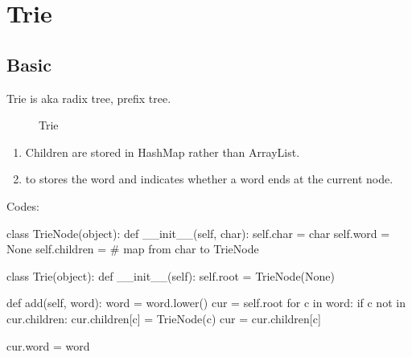 \section{Trie}
\subsection{Basic}
Trie is aka radix tree, prefix tree. 
\begin{figure}[hbtp]
\centering
{}
\caption{Trie}
\label{fig:trie} 
\end{figure}
\begin{enumerate}
\item Children are stored in HashMap rather than ArrayList. 
\item {} to stores the word and indicates whether a word ends at the current
node. 
\end{enumerate}
Codes:
\begin{python}
class TrieNode(object):
    def __init__(self, char):
        self.char = char
        self.word = None
        self.children = {}  # map from char to TrieNode


class Trie(object):
    def __init__(self):
        self.root = TrieNode(None)

    def add(self, word):
        word = word.lower()
        cur = self.root
        for c in word:
            if c not in cur.children:
                cur.children[c] = TrieNode(c)
            cur = cur.children[c]
            
        cur.word = word
\end{python}

